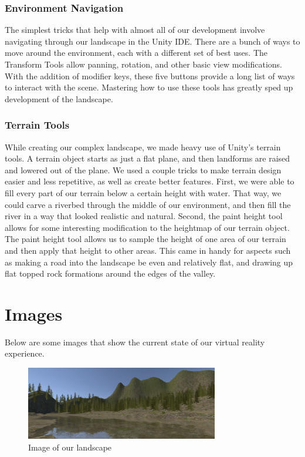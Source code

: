 \documentclass[10pt,journal,compsoc,onecolumn, draftclsnofoot]{IEEEtran}
\begin{document}
\subsubsection{Environment Navigation}
The simplest tricks that help with almost all of our development involve navigating through our landscape in the Unity IDE.
There are a bunch of ways to move around the environment, each with a different set of best uses.
The Transform Tools allow panning, rotation, and other basic view modifications.
With the addition of modifier keys, these five buttons provide a long list of ways to interact with the scene.
Mastering how to use these tools has greatly sped up development of the landscape.

\subsubsection{Terrain Tools}
While creating our complex landscape, we made heavy use of Unity's terrain tools.
A terrain object starts as just a flat plane, and then landforms are raised and lowered out of the plane.
We used a couple tricks to make terrain design easier and less repetitive, as well as create better features.
First, we were able to fill every part of our terrain below a certain height with water.
That way, we could carve a riverbed through the middle of our environment, and then fill the river in a way that looked realistic and natural.
Second, the paint height tool allows for some interesting modification to the heightmap of our terrain object.
The paint height tool allows us to sample the height of one area of our terrain and then apply that height to other areas.
This came in handy for aspects such as making a road into the landscape be even and relatively flat, and drawing up flat topped rock formations around the edges of the valley.

\section{Images}
Below are some images that show the current state of our virtual reality experience.

\vspace{1cm}

\begin{figure}[h]
    \centering
    \includegraphics[width=0.75\textwidth]{landscape.png}
    \caption{Image of our landscape}
\end{figure}
\end{document}
